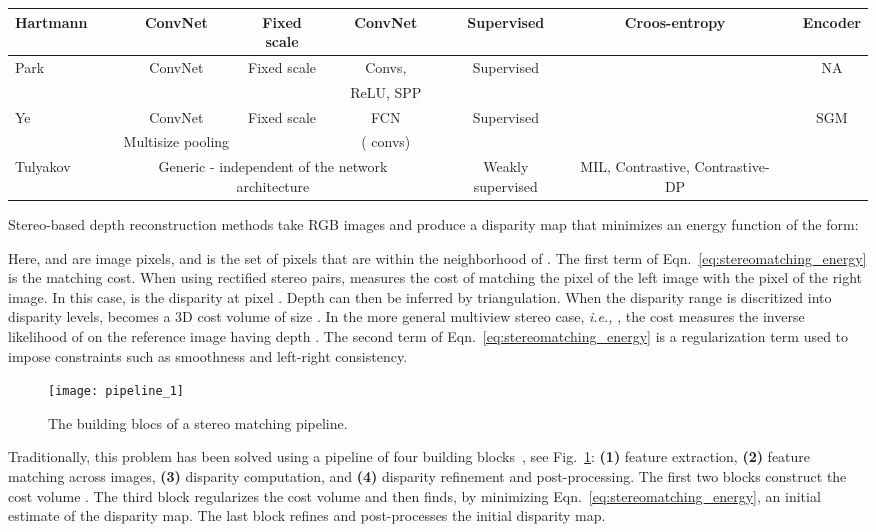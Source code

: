 \documentclass[10pt,journal,compsoc]{IEEEtran}
\newcommand{\ie}{\emph{i.e., }}
\newcommand{\noi}{\noindent}
\begin{document}
\begin{table*}
{\begin{tabular}{@{}l@{ }c@{ }c@{ }c@{ }c@{ }c@{ }c@{ }c@{ }c@{ }c@{ }c@{}}
	Hartmann~\cite{hartmann2017learned}&& ConvNet & Fixed scale&  &  ConvNet& &Supervised & Croos-entropy& & Encoder \\
	\hline

	Park~\cite{park2017look}&& ConvNet & Fixed scale & &  Convs,   & & Supervised &  & & NA \\
						& & & & &   ReLU, SPP & & & & & \\	
	\hline

	Ye~\cite{ye2017efficient}&& ConvNet &  Fixed scale & &  FCN    & & Supervised&  & & SGM\\
						      & & Multisize pooling &    & &    ( convs) & & &  & & \\
	\hline

	Tulyakov~\cite{tulyakov2017weakly}&&  \multicolumn{4}{c}{Generic - independent of the network architecture}  & & Weakly supervised & MIL, Contrastive, Contrastive-DP& & \\

	\bottomrule	
	\end{tabular}
	}
\end{table*}


Stereo-based depth reconstruction methods take  RGB images  and produce  a disparity map   that minimizes an energy function of the form:


\noi Here,  and  are image pixels, and  is the set of pixels that are within the neighborhood of . The first term of Eqn.~\eqref{eq:stereomatching_energy} is the matching cost. When using rectified stereo pairs,  measures the cost of matching the pixel  of the left image with the pixel  of the right image.   In this case,  is  the disparity at pixel . Depth can then be inferred by triangulation.  When the disparity range is discritized into  disparity levels,  becomes a 3D cost volume of size .  In the more general multiview stereo case, \ie , the cost  measures the inverse likelihood of  on the reference image having depth .   The second term of Eqn.~\eqref{eq:stereomatching_energy} is a regularization term used to impose  constraints  such as   smoothness and left-right  consistency. 


\begin{figure}
	\texttt{[image: pipeline\_1]}
	\caption{\label{fig:stereo_matching_pipeline} The building blocs of a stereo matching pipeline. }
\end{figure}

Traditionally, this problem has been solved using a pipeline of  four building blocks~\cite{scharstein2002taxonomy}, see Fig.~\ref{fig:stereo_matching_pipeline}:  \textbf{(1)} feature extraction, \textbf{(2)} feature matching across images,  \textbf{(3)} disparity  computation, and \textbf{(4)} disparity refinement and post-processing.  The first two blocks construct the cost volume .  The third block regularizes the cost volume and then finds, by minimizing Eqn.~\eqref{eq:stereomatching_energy}, an initial estimate of the disparity map. The last block refines and post-processes the initial disparity map.  
\end{document}
